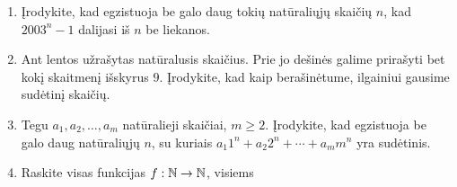 \begin{enumerate}
   \item \text{[LitKo 2002]} Įrodykite, kad egzistuoja be galo daug tokių
    natūraliųjų skaičių $n$, kad $2003^n - 1$ dalijasi iš $n$ be liekanos.
  \item {} Ant lentos užrašytas
    natūralusis skaičius. Prie jo dešinės galime prirašyti bet kokį
    skaitmenį išskyrus $9$. Įrodykite, kad kaip berašinėtume, ilgainiui
    gausime sudėtinį skaičių.
  \item \text{[CWMO 2008]} Tegu $a_1, a_2, \dots, a_m$ natūralieji
    skaičiai, $m\geq 2$. Įrodykite, kad egzistuoja be galo daug natūraliųjų
    $n$, su kuriais $a_1 1^n + a_2 2^n + \cdots + a_m m^n$ yra sudėtinis.
  \item \text{[CMO 2008]} Raskite visas funkcijas $f:\mathbb N \to \mathbb N$, visiems

\end{enumerate}
